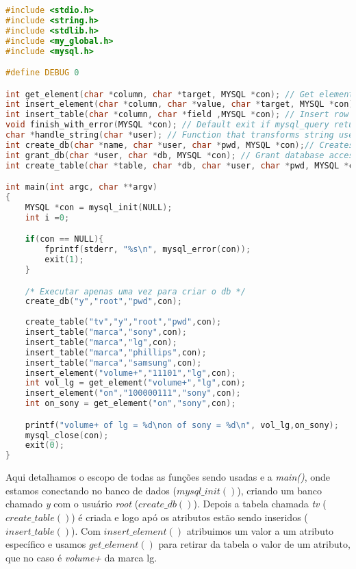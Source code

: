 \begin{lstlisting}[language=c, caption={db on c general structure}, label={lst:dbphi1}]
#include <stdio.h>
#include <string.h>
#include <stdlib.h>
#include <my_global.h>
#include <mysql.h>

#define DEBUG 0

int get_element(char *column, char *target, MYSQL *con); // Get element from table and store in an INT variable, pass the column and the row ("volume+","sony",con)
int insert_element(char *column, char *value, char *target, MYSQL *con); // Insert element in the table, pass the column and and the row ("volume+","11111","lg", con);
int insert_table(char *column, char *field ,MYSQL *con); // Insert row in the table, pass the column and the field ("marca","lg",con)
void finish_with_error(MYSQL *con); // Default exit if mysql_query returns an error
char *handle_string(char *user); // Function that transforms string user into "user", not used now (was used by grant_db to grant database access to a user)
int create_db(char *name, char *user, char *pwd, MYSQL *con);// Creates the database, pass the name, user accessing and pwd of the user ("phi_project","root","pwd",con);
int grant_db(char *user, char *db, MYSQL *con); // Grant database access to a specific user, not being used right now due to seg fault.
int create_table(char *table, char *db, char *user, char *pwd, MYSQL *con); // Create a table in the database, right now is a default table defined by the strings on the function

int main(int argc, char **argv)
{
	MYSQL *con = mysql_init(NULL);
	int i =0;

	if(con == NULL){
		fprintf(stderr, "%s\n", mysql_error(con));
		exit(1);
	}

	/* Executar apenas uma vez para criar o db */
	create_db("y","root","pwd",con);
	
	create_table("tv","y","root","pwd",con);
	insert_table("marca","sony",con);
	insert_table("marca","lg",con);
	insert_table("marca","phillips",con);
	insert_table("marca","samsung",con);
	insert_element("volume+","11101","lg",con);
	int vol_lg = get_element("volume+","lg",con);
	insert_element("on","100000111","sony",con);
	int on_sony = get_element("on","sony",con);

	printf("volume+ of lg = %d\non of sony = %d\n", vol_lg,on_sony);
	mysql_close(con);
	exit(0);
}
\end{lstlisting}

Aqui detalhamos o escopo de todas as fun\c{c}\~{o}es sendo usadas e a \textit{main()}, onde estamos conectando no 
banco de dados (\textit{$mysql\_init()$}), criando um banco chamado \textit{y} com o usu\'{a}rio \textit{root} 
(\textit{$create\_db()$}). Depois a tabela chamada \textit{tv} (\textit{$create\_table()$}) \'{e} criada e logo 
ap\'{o} os atributos est\~{a}o sendo inseridos (\textit{$insert\_table()$}). Com \textit{$insert\_element()$} 
atribuimos um valor a um atributo espec\'{i}fico e usamos \textit{$get\_element()$} para retirar da tabela o valor de 
um atributo, que no caso \'{e} \textit{volume+} da marca lg.

